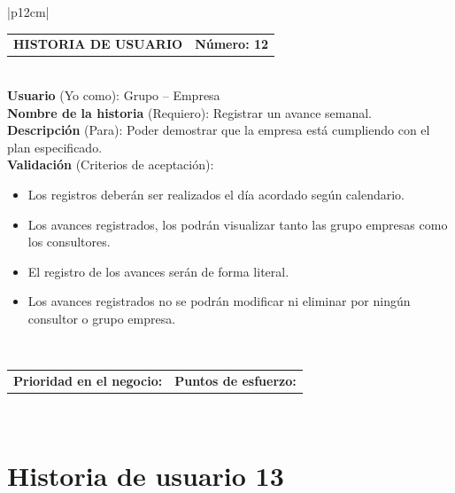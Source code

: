 \documentclass[11pt,letterpaper]{report}
\begin{document}
	\begin{center}	
		\begin{tabular}{|p{12cm}|}
			\hline
			\begin{tabular}{c|c}
				\textbf{HISTORIA DE USUARIO} & \textbf{Número: 12} \\
			\end{tabular} \\ \hline
			\textbf{Usuario} (Yo como): Grupo – Empresa \\ \hline
			\textbf{Nombre de la historia} (Requiero): Registrar un avance semanal. \\ \hline
			\textbf{Descripción} (Para): Poder demostrar que la empresa está cumpliendo con el plan especificado. \\ \hline
			\textbf{Validación} (Criterios de aceptación): \\
			\begin{minipage}{12cm}
				\begin{itemize}
					\item Los registros deberán ser realizados el día acordado según calendario.
					\item Los avances registrados, los podrán visualizar tanto las grupo empresas como los consultores.
					\item El registro de los avances serán de forma literal.
					\item Los avances registrados no se podrán modificar ni eliminar por ningún consultor o grupo empresa.
				\end{itemize}
			\end{minipage} \\ \hline
			\begin{tabular}{c|c}
				\textbf{Prioridad en el negocio: } & \textbf{Puntos de esfuerzo: } \\
			\end{tabular} \\ \hline
		\end{tabular}
	\end{center}
	
	\section{Historia de usuario 13}
	
\end{document}
